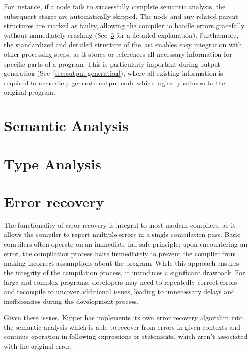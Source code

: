 For instance, if a node fails to successfully complete semantic analysis, the subsequent stages are automatically skipped. The node and any related parent structures are marked as faulty, allowing the compiler to handle errors gracefully without immediately crashing (See~\ref{sec:error-recovery} for a detailed explanation). Furthermore, the standardized and detailed structure of the~\acrshort{ast} enables easy integration with other processing steps, as it stores or references all necessary information for specific parts of a program. This is particularly important during output generation (See~\ref{sec:output-generation}), where all existing information is required to accurately generate output code which logically adheres to the original program.

\section{Semantic Analysis}
\label{sec:semantic-analysis}

\section{Type Analysis}
\label{sec:type-analysis}

\section{Error recovery}
\label{sec:error-recovery}

The functionality of error recovery is integral to most modern compilers, as it allows the compiler to report multiple errors in a single compilation pass. Basic compilers often operate on an immediate fail-safe principle: upon encountering an error, the compilation process halts immediately to prevent the compiler from making incorrect assumptions about the program. While this approach ensures the integrity of the compilation process, it introduces a significant drawback. For large and complex programs, developers may need to repeatedly correct errors and recompile to uncover additional issues, leading to unnecessary delays and inefficiencies during the development process.

Given these issues, Kipper has implements its own error recovery algorithm into the semantic analysis which is able to recover from errors in given contexts and continue operation in following expressions or statements, which aren't associated with the original error.

